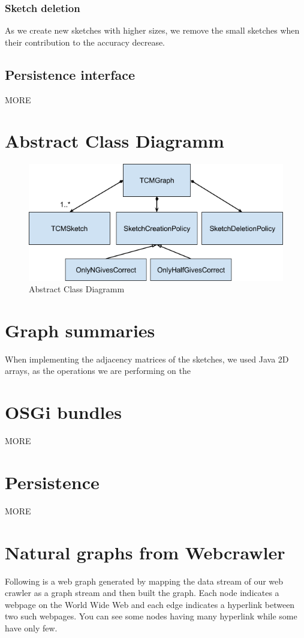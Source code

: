 \documentclass[12pt]{report}
\numberwithin{figure}{section}
\numberwithin{table}{section}
\begin{document}
\subsubsection{Sketch deletion}
As we create new sketches with higher sizes, we remove the small sketches when their contribution to the accuracy decrease.

\subsection{Persistence interface}
MORE

\section{Abstract Class Diagramm}

\begin{figure}[H]
\centering
\includegraphics[scale=0.8]{images/image06}
\caption{Abstract Class Diagramm}
\end{figure}

\section{Graph summaries}
When implementing the adjacency matrices of the sketches, we used Java 2D arrays, as the operations we are performing on the
 
\section{OSGi bundles}

MORE

\section{Persistence}

MORE

\section{Natural graphs from Webcrawler}
Following is a web graph generated by mapping the data stream of our web crawler as a graph stream and then built the graph. Each node indicates a webpage on the World Wide Web and each edge indicates a hyperlink between two such webpages. You can see some nodes having many hyperlink while some have only few. 
\end{document}
